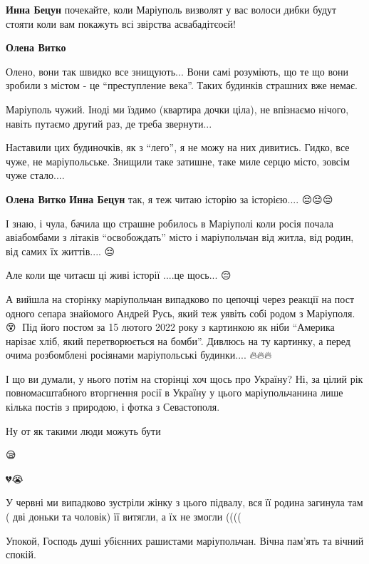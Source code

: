 \begin{itemize} %
\textbf{Инна Бецун} почекайте, коли Маріуполь визволят у вас волоси дибки будут стояти коли вам покажуть всі звірства асвабадітєоєй!

\textbf{Олена Витко} 

Олено, вони так швидко все знищують... Вони самі розуміють, що те що вони
зробили з містом - це \enquote{преступление века}. Таких будинків страшних вже
немає.

Маріуполь чужий. Іноді ми їздимо (квартира дочки ціла), не впізнаємо нічого,
навіть путаємо другий раз, де треба звернути...

Наставили цих будиночків, як з \enquote{лего}, я не можу на них дивитись.
Гидко, все чуже, не маріупольське. Знищили таке затишне, таке миле серцю місто,
зовсім чуже стало....

\textbf{Олена Витко} \textbf{Инна Бецун} так, я теж читаю історію за історією.... 😔😔😔

І знаю, і чула, бачила що страшне робилось в Маріуполі коли росія почала
авіабомбами з літаків \enquote{освобождать} місто і маріупольчан від житла, від родин,
від самих їх життів.... 😔

Але коли ще читаєш ці живі історії ....це щось... 😔

А вийшла на сторінку маріупольчан випадково по цепочці через реакції на пост
одного сепара знайомого Андрей Русь, який теж уявіть собі родом з
Маріуполя.😵🤯 Під його постом за 15 лютого 2022 року з картинкою як ніби
\enquote{Америка нарізає хліб, який перетворюється на бомби}. Дивлюсь на ту картинку, а
перед очима розбомблені росіянами маріупольські будинки.... 🔥🔥🔥

І що ви думали, у нього потім на сторінці хоч щось про Україну? Ні, за цілий
рік повномасштабного вторгнення росії в Україну у цього маріупольчанина лише
кілька постів з природою, і фотка з Севастополя.

Ну от як такими люди можуть бути 🤮🤮

\end{itemize} %


😪


💔😭


У червні ми випадково зустріли жінку з цього підвалу, вся її родина загинула
там ( дві доньки та чоловік) її витягли, а їх не змогли ((((


Упокой, Господь душі убієнних рашистами маріупольчан. Вічна пам'ять та вічний спокій.
